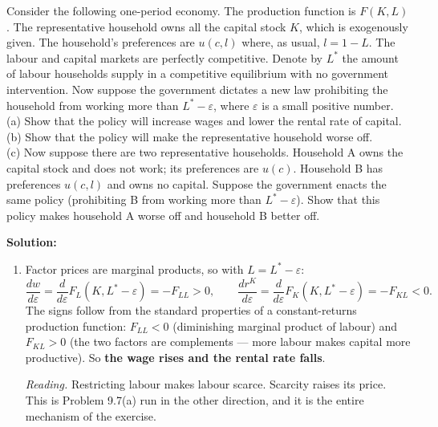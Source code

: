 \documentclass[12pt, letterpaper]{article}
\newcommand{\dd}[2]{\dfrac{d #1}{d #2}}
\newcommand{\stst}{^{\ast}}
\begin{document}
\begin{tcolorbox}[evenbox,title={Problem 9.4 \quad Pro-Worker Policies}]
\begin{tcolorbox}[questionbox]
Consider the following one-period economy. The production function is $F(K,L)$. The
representative household owns all the capital stock $K$, which is exogenously given. The
household's preferences are $u(c,l)$ where, as usual, $l=1-L$. The labour and capital markets
are perfectly competitive. Denote by $L\stst$ the amount of labour households supply in a
competitive equilibrium with no government intervention. Now suppose the government dictates a
new law prohibiting the household from working more than $L\stst-\varepsilon$, where
$\varepsilon$ is a small positive number.\\[3pt]
(a) Show that the policy will increase wages and lower the rental rate of capital.\\
(b) Show that the policy will make the representative household worse off.\\
(c) Now suppose there are two representative households. Household A owns the capital stock
and does not work; its preferences are $u(c)$. Household B has preferences $u(c,l)$ and owns
no capital. Suppose the government enacts the same policy (prohibiting B from working more than
$L\stst-\varepsilon$). Show that this policy makes household A worse off and household B better
off.
\end{tcolorbox}

\textbf{Solution:}

\begin{enumerate}
\item Factor prices are marginal products, so with $L=L\stst-\varepsilon$:
\[
\dd{w}{\varepsilon}=\dd{}{\varepsilon}F_L(K,L\stst-\varepsilon)=-F_{LL}>0,
\qquad
\dd{r^K}{\varepsilon}=\dd{}{\varepsilon}F_K(K,L\stst-\varepsilon)=-F_{KL}<0 .
\]
The signs follow from the standard properties of a constant-returns production function:
$F_{LL}<0$ (diminishing marginal product of labour) and $F_{KL}>0$ (the two factors are
complements --- more labour makes capital more productive). So \textbf{the wage rises and the
rental rate falls}. \checkmark

\emph{Reading.} Restricting labour makes labour scarce. Scarcity raises its price. This is
Problem 9.7(a) run in the other direction, and it is the entire mechanism of the exercise.


\end{enumerate}
\end{tcolorbox}
\end{document}
